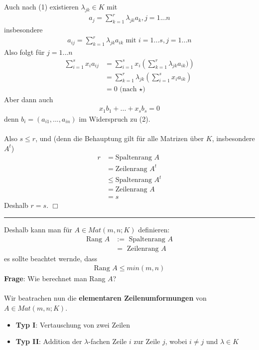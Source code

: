 \documentclass[11pt]{report}
\newcommand*\f[1] {\textbf{#1}}
\begin{document}
Auch nach (1) existieren $\lambda_{jk} \in K$ mit 
\begin{align}
 a_j = \sum_{k=1}^r \lambda_{jk} a_k, j=1...n
\end{align}
insbesondere
\begin{align}
 a_{ij} = \sum_{k=1}^r \lambda_{jk} a_{ik} \text{ mit } i = 1...s, j = 1...n
\end{align}
Also folgt für $j=1...n$
\begin{align}
\sum_{i=1}^s x_i a_{ij} &= \sum_{i=1}^s x_i \left(\sum_{k=1}^r \lambda_{jk} a_{ik})\right) \\
&= \sum_{k=1}^r \lambda_{jk} \left(\sum_{i=1}^s x_i a_{ik}\right) \\
&= 0 \text{ (nach } \star) 
\end{align}
Aber dann auch
\begin{align}
 x_1 b_1 + ... + x_s b_s = 0
\end{align}
denn $b_i = (a_{i1}, ..., a_{in})$ im Widerspruch zu (2).\\\\
Also $s \leq r$, und (denn die Behauptung gilt für alle Matrizen über $K$, insbesondere $A^t$)
\begin{align}
r &= \text{Spaltenrang } A \\
 &= \text{Zeilenrang } A^t \\
 &\leq \text{Spaltenrang } A^t \\
 &= \text{Zeilenrang } A \\
 &= s
\end{align}
Deshalb $r=s$. \hfill $\Box$
\vspace*{0.2cm}\rule{\linewidth}{0.3mm}\vspace{0.2cm}
Deshalb kann man für $A \in Mat(m,n; K)$ definieren:
\begin{align}
 \text{Rang } A &:= \text{ Spaltenrang } A \\
 &= \text{ Zeilenrang } A
\end{align}
es sollte beachtet wernde, dass
\begin{align}
\text{Rang } A \leq min(m,n)
\end{align}
\f{Frage}: Wie berechnet man Rang $A$?\\\\
Wir beatrachen nun die \f{elementaren Zeilenumformungen} von $A \in Mat(m, n; K)$.
\begin{itemize}
 \item \f{Typ I}: Vertauschung von zwei Zeilen
 \item \f{Typ II}: Addition der $\lambda$-fachen Zeile $i$ zur Zeile $j$, wobei $i\neq j$ und $\lambda \in K$
\end{itemize}
\end{document}
